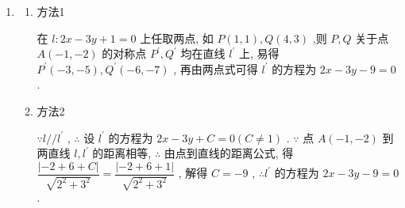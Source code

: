 \begin{enumerate}
\begin{jieda}
\begin{enumerate}
\begin{enumerate}[(1)]
                $\because$ 点 ${M}^{\prime }$ 在直线 ${3x} - {2y} - 6 = 0$ 上,
                $\therefore$ 将 (*) 式代入,得 $3\left( \dfrac{5}{13}x+\dfrac{12}{13}y-\dfrac{4}{13}\right)  - 2\left( \dfrac{12}{13}x-\dfrac{5}{13}y+\dfrac{6}{13}\right)  - 6 = 0$ ,
                化简得 ${9x} - {46y} + {102} = 0$ .                    
                \item 方法2 \\
                在直线 $m$ 上取一点,如 $M\left( {2,0}\right)$ ,
                则 $M\left( {2,0}\right)$ 关于直线 $l$ 的对称点 ${M}^{\prime }$ 必在直线 ${m}^{\prime }$ 上.
                设对称点为 ${M}^{\prime }\left( {a,b}\right)$ ,则
                $\left\{  {\begin{array}{l} 2 \times  \dfrac{a + 2}{2} - 3 \times  \dfrac{b + 0}{2} + 1 = 0, \\  \dfrac{b - 0}{a - 2} \times  \dfrac{2}{3} =  - 1, \end{array}\;\text{ 得 }{M}^{\prime }\left( {\dfrac{6}{13},\dfrac{30}{13}}\right) .}\right.$
                设直线 $m$ 与直线 $l$ 的交点为 $N$ ,
                由 $\left\{  \begin{array}{l} {2x} - {3y} + 1 = 0, \\  {3x} - {2y} - 6 = 0, \end{array}\right.$ 得 $N\left( {4,3}\right)$ .
                又 ${m}^{\prime }$ 经过点 $N\left( {4,3}\right)$ ,
                $\therefore$ 由两点式得直线 ${m}^{\prime }$ 的方程为 ${9x} - {46y} + {102} = 0$ .
            \end{enumerate}
            \item \begin{enumerate}[(1)]
                \item 方法1
                
                在 $l : {2x} - {3y} + 1 = 0$ 上任取两点,
                如 $P\left( {1,1}\right) ,Q\left( {4,3}\right)$ ,则 $P,Q$ 关于点 $A\left( {-1, - 2}\right)$ 的对称点 ${P}^{\prime },{Q}^{\prime }$ 均在直线 ${l}^{\prime }$ 上,
                易得 ${P}^{\prime }\left( {-3, - 5}\right) ,{Q}^{\prime }\left( {-6, - 7}\right)$ ,
                再由两点式可得 ${l}^{\prime }$ 的方程为 ${2x} - {3y} - 9 = 0$ .
                \item 方法2
                
                $\because l//{l}^{\prime }$ ,
                $\therefore$ 设 ${l}^{\prime }$ 的方程为 ${2x} - {3y} + C = 0\left( {C \neq  1}\right)$ .
                $\because$ 点 $A\left( {-1, - 2}\right)$ 到两直线 $l,{l}^{\prime }$ 的距离相等,
                $\therefore$ 由点到直线的距离公式,
                得 $\dfrac{\left| -2 + 6 + C\right| }{\sqrt{{2}^{2} + {3}^{2}}} = \dfrac{\left| -2 + 6 + 1\right| }{\sqrt{{2}^{2} + {3}^{2}}}$ ,
                解得 $C =  - 9$ ,
                $\therefore {l}^{\prime }$ 的方程为 ${2x} - {3y} - 9 = 0$ .
            \end{enumerate}
        \end{enumerate}
    \end{jieda}
\end{enumerate}
